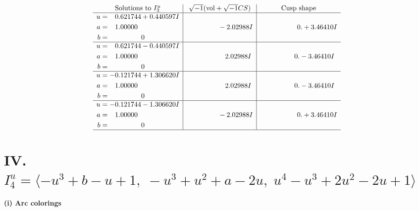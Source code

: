 \documentclass[1p]{elsarticle_modified}
\theoremstyle{definition}
\newcommand{\I}{\sqrt{-1}}
\begin{document}
$$\begin{array}{c|c|c}  
\text{Solutions to }I^u_{3}& \I (\text{vol} + \sqrt{-1}CS) & \text{Cusp shape}\\
 \hline 
\begin{aligned}
u &= \phantom{-}0.621744 + 0.440597 I \\
a &= \phantom{-}1.00000\phantom{ +0.000000I} \\
b &= \phantom{-0.000000 } 0\end{aligned}
 & \phantom{-0.000000 } -2.02988 I & \phantom{-0.000000 -}0. + 3.46410 I \\ \hline\begin{aligned}
u &= \phantom{-}0.621744 - 0.440597 I \\
a &= \phantom{-}1.00000\phantom{ +0.000000I} \\
b &= \phantom{-0.000000 } 0\end{aligned}
 & \phantom{-0.000000 -}2.02988 I & \phantom{-0.000000 } 0. - 3.46410 I \\ \hline\begin{aligned}
u &= -0.121744 + 1.306620 I \\
a &= \phantom{-}1.00000\phantom{ +0.000000I} \\
b &= \phantom{-0.000000 } 0\end{aligned}
 & \phantom{-0.000000 -}2.02988 I & \phantom{-0.000000 } 0. - 3.46410 I \\ \hline\begin{aligned}
u &= -0.121744 - 1.306620 I \\
a &= \phantom{-}1.00000\phantom{ +0.000000I} \\
b &= \phantom{-0.000000 } 0\end{aligned}
 & \phantom{-0.000000 } -2.02988 I & \phantom{-0.000000 -}0. + 3.46410 I\\
 \hline 
 \end{array}$$\newpage\newpage\renewcommand{\arraystretch}{1}
\centering \section*{IV. $I^u_{4}= \langle - u^3+b- u+1,\;- u^3+u^2+a-2 u,\;u^4- u^3+2 u^2-2 u+1 \rangle$}
\flushleft \textbf{(i) Arc colorings}\\
\end{document}

